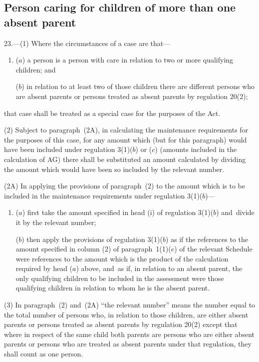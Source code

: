 \documentclass[12pt,a4paper]{article}
\begin{document}
\subsection[23. Person caring for children of more than one absent parent]{Person caring for children of more than one absent parent}

23.—(1) Where the circumstances of a case are that—
\begin{enumerate}\item[]
($a$) a person is a person with care in relation to two or more qualifying children; and

($b$) in relation to at least two of those children there are different persons who are absent parents or persons treated as absent parents by regulation 20(2);
\end{enumerate}
that case shall be treated as a special case for the purposes of the Act.

(2) 
Subject to paragraph~(2A), %
in calculating the maintenance requirements for the purposes of this case, for any amount which (but for this paragraph) would have been included under regulation 3(1)($b$)
or ($c$)  %
(amounts included in the calculation of AG) there shall be substituted an amount calculated by dividing the amount which would have been so included by the relevant number.

(2A) In applying the provisions of paragraph~(2) to the amount which is to be included in the maintenance requirements under regulation 3(1)($b$)—
\begin{enumerate}\item[]
($a$) first take the amount specified in head (i) of regulation 3(1)($b$) and~divide it by the relevant number;

($b$) then apply the provisions of regulation 3(1)($b$) as if the references to the amount specified in column (2) of paragraph~1(1)($e$) of the relevant Schedule were references to the amount which is the product of the calculation required by head ($a$) above, and~as if, in relation to an absent parent, the only qualifying children to be included in the assessment were those qualifying children in relation to whom he is the absent parent.\end{enumerate}

(3) 
In paragraph~(2) and~(2A) %
“the relevant number” means the number equal to the total number of persons who, in relation to those children, are either absent parents or persons treated as absent parents by regulation 20(2) except that where in respect of the same child both parents are persons who are either absent parents or persons who are treated as absent parents under that regulation, they shall count as one person.
\end{document}
